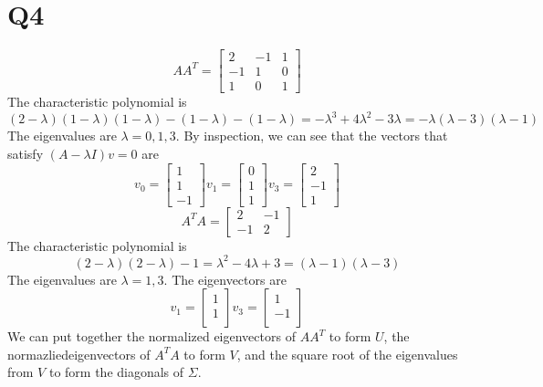 \documentclass{article}
\begin{document}
\section*{Q4}
\[
    AA^T = 
    \begin{bmatrix}
        2 & -1 & 1 \\
        -1 & 1 & 0 \\
        1 & 0 & 1
    \end{bmatrix}
\]
The characteristic polynomial is 
\[
    (2-\lambda)(1-\lambda)(1-\lambda) - (1-\lambda) - (1-\lambda)
    = -\lambda^3 + 4 \lambda^2 - 3\lambda
    = -\lambda(\lambda-3)(\lambda-1)
\]
The eigenvalues are $\lambda = 0, 1, 3$.
By inspection, we can see that the vectors that satisfy $(A-\lambda I)v = 0$ are
\[
    v_0 = 
    \begin{bmatrix}
        1 \\ 
        1 \\
        -1
    \end{bmatrix}
    v_1 = 
    \begin{bmatrix}
        0 \\
        1 \\
        1
    \end{bmatrix}
    v_3 = 
    \begin{bmatrix}
        2 \\
        -1 \\
        1
    \end{bmatrix}
\]
\[
    A^TA = \begin{bmatrix}
        2 & -1 \\
        -1 & 2
    \end{bmatrix}
\]
The characteristic polynomial is 
\[
    (2-\lambda)(2-\lambda) - 1 = \lambda^2 - 4\lambda + 3 = (\lambda -1)(\lambda-3)
\]
The eigenvalues are $\lambda = 1, 3$.
The eigenvectors are \
\[
    v_1 = 
    \begin{bmatrix}
        1 \\
        1 \\
    \end{bmatrix}
    v_3 = 
    \begin{bmatrix}
        1 \\
        -1 \\

    \end{bmatrix}
\]
We can put together the normalized eigenvectors of $AA^T$ to form $U$,
the normazliedeigenvectors of $A^TA$ to form $V$, and the square root of 
the eigenvalues from $V$ to form the diagonals of $\Sigma$.
\end{document}

